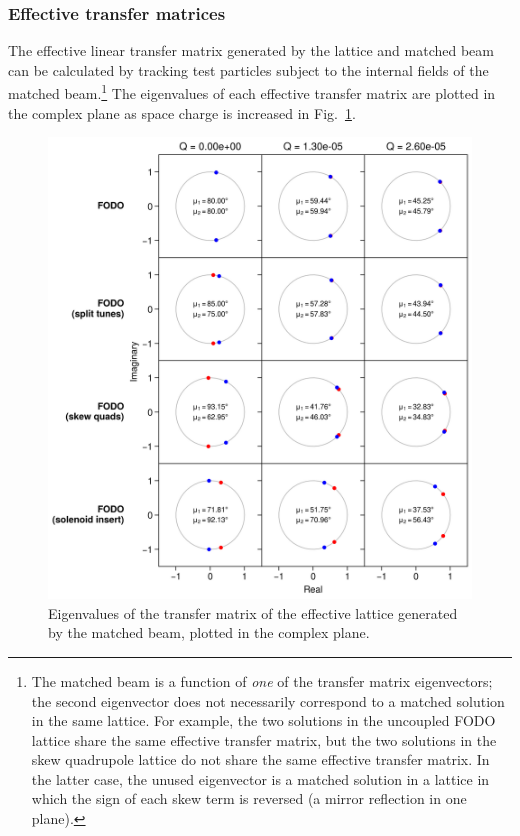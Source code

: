 \subsubsection{Effective transfer matrices}

The effective linear transfer matrix generated by the lattice and matched beam can be calculated by tracking test particles subject to the internal fields of the matched beam.\footnote{The matched beam is a function of \textit{one} of the transfer matrix eigenvectors; the second eigenvector does not necessarily correspond to a matched solution in the same lattice. For example, the two solutions in the uncoupled FODO lattice share the same effective transfer matrix, but the two solutions in the skew quadrupole lattice do not share the same effective transfer matrix. In the latter case, the unused eigenvector is a matched solution in a lattice in which the sign of each skew term is reversed (a mirror reflection in one plane).} The eigenvalues of each effective transfer matrix are plotted in the complex plane as space charge is increased in Fig.~\ref{fig:effective_transfer_matrix_eigvals}.
%
\begin{figure}[!p]
    \centering
    \includegraphics[width=\textwidth]{Images/chapter2/eigvals.png}
    \caption{Eigenvalues of the transfer matrix of the effective lattice generated by the matched beam, plotted in the complex plane.}
    \label{fig:effective_transfer_matrix_eigvals}
\end{figure}
